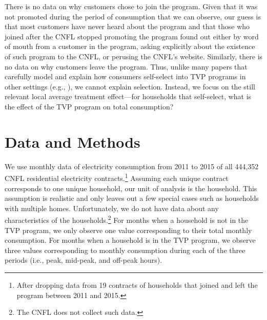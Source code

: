 \documentclass[12pt]{article}
\begin{document}
There is no data on why customers chose to join the program. Given that it was not promoted during the period of consumption that we can observe, our guess is that most customers have never heard about the program and that those who joined after the CNFL stopped promoting the program found out either by word of mouth from a customer in the program, asking explicitly about the existence of such program to the CNFL, or perusing the CNFL’s website. Similarly, there is no data on why customers leave the program. Thus, unlike many papers that carefully model and explain how consumers self-select into TVP programs in other settings (e.g., \cite{itoSelectionWelfareGains2021}), we cannot explain selection. Instead, we focus on the still relevant local average treatment effect---for households that self-select, what is the effect of the TVP program on total consumption?

\section{Data and Methods}

We use monthly data of electricity consumption from 2011 to 2015 of all 444,352 CNFL residential electricity contracts.\footnote{After dropping data from 19 contracts of households that joined and left the program between 2011 and 2015.} Assuming each unique contract corresponds to one unique household, our unit of analysis is the household. This assumption is realistic and only leaves out a few special cases such as households with multiple homes. Unfortunately, we do not have data about any characteristics of the households.\footnote{The CNFL does not collect such data.} For months when a household is not in the TVP program, we only observe one value corresponding to their total monthly consumption. For months when a household is in the TVP program, we observe three values corresponding to monthly consumption during each of the three periods (i.e., peak, mid-peak, and off-peak hours).
\end{document}
